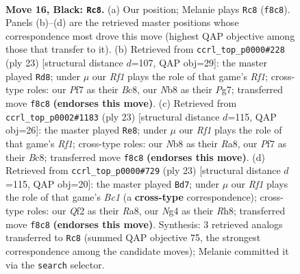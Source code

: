 \documentclass[11pt]{article}
\begin{document}
\clearpage

\begin{figure}[p]\centering
\begin{subfigure}{0.46\textwidth}\centering
\resizebox{\linewidth}{!}{%
\newchessgame
\chessboard[
  setfen={rn3rk1/pp1b1ppp/4p3/8/2B1P1nP/1Q3N2/PP1N1qP1/R2K3R b - - 6 16},
  showmover=false,
  pgfstyle=straightmove, color=movearrow, markmove={f8-c8}
]}
\caption{}
\end{subfigure}\hfill
\begin{subfigure}{0.46\textwidth}\centering
\resizebox{\linewidth}{!}{%
\newchessgame
\chessboard[
  setfen={r1b2rk1/pp3pp1/2n2b1p/q1Pp4/8/2N1PN2/PP1QBPPP/R3K2R b KQ - 4 12},
  showmover=false,
  pgfstyle=straightmove, color=movearrow, markmove={f8-d8}
]}
\caption{}
\end{subfigure}
\\[4pt]
\begin{subfigure}{0.46\textwidth}\centering
\resizebox{\linewidth}{!}{%
\newchessgame
\chessboard[
  setfen={r1b2rk1/pp1nqppp/2p5/4P3/4P3/2Q2N2/PP3PPP/2R1KB1R b K - 0 12},
  showmover=false,
  pgfstyle=straightmove, color=movearrow, markmove={f8-e8}
]}
\caption{}
\end{subfigure}\hfill
\begin{subfigure}{0.46\textwidth}\centering
\resizebox{\linewidth}{!}{%
\newchessgame
\chessboard[
  setfen={r1bqk2r/pp3ppp/1n2p3/1B1PP3/8/2N1bN2/PP4PP/R2QK2R b KQkq - 3 12},
  showmover=false,
  pgfstyle=straightmove, color=movearrow, markmove={c8-d7}
]}
\caption{}
\end{subfigure}
\caption{\textbf{Move 16, Black: \texttt{Rc8}.} (a) Our position; Melanie plays \texttt{Rc8} (\texttt{f8c8}). Panels (b)--(d) are the retrieved master positions whose correspondence most drove this move (highest QAP objective among those that transfer to it). (b) Retrieved from \texttt{ccrl\_top\_p0000\#228} (ply 23) [structural distance $d$=107, QAP obj=29]: the master played \texttt{Rd8}; under $\mu$ our \emph{Rf1} plays the role of that game's \emph{Rf1}; cross-type roles: our \emph{P}f7 as their \emph{B}c8, our \emph{N}b8 as their \emph{P}g7; transferred move \texttt{f8c8} \textbf{(endorses this move)}. (c) Retrieved from \texttt{ccrl\_top\_p0002\#1183} (ply 23) [structural distance $d$=115, QAP obj=26]: the master played \texttt{Re8}; under $\mu$ our \emph{Rf1} plays the role of that game's \emph{Rf1}; cross-type roles: our \emph{N}b8 as their \emph{R}a8, our \emph{P}f7 as their \emph{B}c8; transferred move \texttt{f8c8} \textbf{(endorses this move)}. (d) Retrieved from \texttt{ccrl\_top\_p0000\#729} (ply 23) [structural distance $d$=115, QAP obj=20]: the master played \texttt{Bd7}; under $\mu$ our \emph{Rf1} plays the role of that game's \emph{Bc1} (a \textbf{cross-type} correspondence); cross-type roles: our \emph{Q}f2 as their \emph{R}a8, our \emph{N}g4 as their \emph{R}h8; transferred move \texttt{f8c8} \textbf{(endorses this move)}. Synthesis: 3 retrieved analogs transferred to \texttt{Rc8} (summed QAP objective 75, the strongest correspondence among the candidate moves); Melanie committed it via the \texttt{search} selector.}
\label{fig:thought-m31}
\end{figure}
\end{document}
